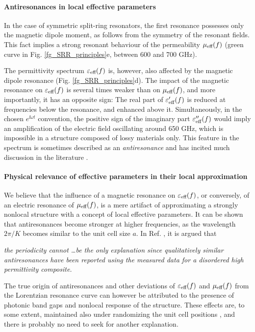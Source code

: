 \paragraph{Antiresonances in local effective parameters}%
In the case of symmetric split-ring resonators, the first resonance possesses only the magnetic dipole moment, as follows from the symmetry of the resonant fields. This fact implies a strong resonant behaviour of the permeability $\mu_{\text{eff} }(f)$ (green curve in Fig. \ref{fg_SRR_principles}e, between 600 and 700 GHz). 

The permittivity spectrum $\varepsilon_{\text{eff} }(f)$ is, however, also affected by the magnetic dipole resonance  (Fig. \ref{fg_SRR_principles}d). The impact of the magnetic resonance on $\varepsilon_{\text{eff} }(f)$ is several times weaker than on $\mu_{\text{eff} }(f)$, and more importantly, it has an opposite sign: The real part of $\varepsilon_{\text{eff} }'(f)$ is reduced at frequencies below the resonance, and enhanced above it. Simultaneously, in the chosen $e^{\ii\omega t}$ convention, the positive sign of the imaginary part $\varepsilon_{\text{eff} }''(f)$ would imply an amplification of the electric field oscillating around 650 GHz, which is impossible in a structure composed of lossy materials only. This feature in the spectrum is sometimes described as an \textit{antiresonance} and has incited much discussion in the literature \cite{koschny2003resonant, wallen2011anti}. 
\paragraph{Physical relevance of effective parameters in their local approximation}%
We believe that the influence of a magnetic resonance on $\varepsilon_{\text{eff} }(f)$, or conversely, of an electric resonance of $\mu_{\text{eff} }(f)$, is a mere artifact of approximating a strongly nonlocal structure with a concept of local effective parameters. It can be shown that antiresonances become stronger at higher frequencies, as the wavelength $2\pi/K$ becomes similar to the unit cell size $a$. 
In Ref. \cite{wallen2011anti}, it is argued that %
\begin{displayquote}
\textit{the periodicity cannot \ldots be the only explanation since qualitatively similar antiresonances have been reported using the measured data for a disordered high permittivity composite.}
\end{displayquote}
The true origin of antiresonances and other deviations of $\varepsilon_{\text{eff} }(f)$ and $\mu_{\text{eff} }(f)$ from the Lorentzian resonance curve can however be attributed to the presence of photonic band gaps and nonlocal response of the structure. These effects are, to some extent, maintained also under randomizing the unit cell positions \cite{peng2007},   
and there is probably no need to seek for another explanation. %

